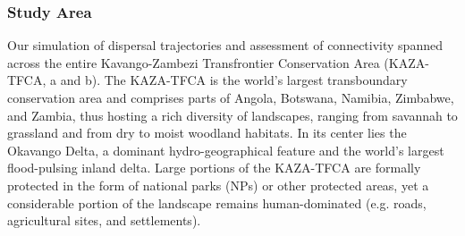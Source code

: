 \documentclass[abstract=on,10pt,a4paper,bibliography=totocnumbered]{article}
\begin{document}

\subsubsection{Study Area}
Our simulation of dispersal trajectories and assessment of connectivity spanned
across the entire Kavango-Zambezi Transfrontier Conservation Area (KAZA-TFCA,
a and b). The KAZA-TFCA is the world's largest transboundary
conservation area and comprises parts of Angola, Botswana, Namibia, Zimbabwe,
and Zambia, thus hosting a rich diversity of landscapes, ranging from savannah
to grassland and from dry to moist woodland habitats. In its center lies the
Okavango Delta, a dominant hydro-geographical feature and the world's largest
flood-pulsing inland delta. Large portions of the KAZA-TFCA are formally
protected in the form of national parks (NPs) or other protected areas, yet a
considerable portion of the landscape remains human-dominated (e.g. roads,
agricultural sites, and settlements).
\end{document}

